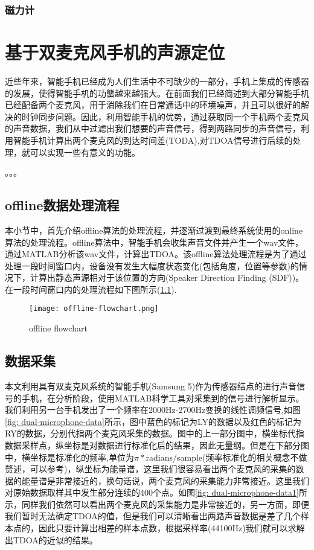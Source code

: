 \documentclass[winfonts]{njuthesis}
\begin{document}
		\subsection{磁力计}

\chapter{基于双麦克风手机的声源定位}\label{chapter_work}
	近些年来，智能手机已经成为人们生活中不可缺少的一部分，手机上集成的传感器的发展，使得智能手机的功螚越来越强大。在前面我们已经简述到大部分智能手机已经配备两个麦克风，用于消除我们在日常通话中的环境噪声，并且可以很好的解决的时钟同步问题。因此，利用智能手机的优势，通过获取同一个手机两个麦克风的声音数据，我们从中过滤出我们想要的声音信号，得到两路同步的声音信号，利用智能手机计算出两个麦克风的到达时间差(TODA),对TDOA信号进行后续的处理，就可以实现一些有意义的功能。
	
	。。。
	
	\section{offline数据处理流程}
	
		本小节中，首先介绍offline算法的处理流程，并逐渐过渡到最终系统使用的online算法的处理流程。offline算法中，智能手机会收集声音文件并产生一个wav文件，通过MATLAB分析该wav文件，计算出TDOA。该offline算法处理流程是为了通过处理一段时间窗口内，设备没有发生大幅度状态变化(包括角度，位置等参数)的情况下，计算出静态声源相对于该位置的方向(Speaker Direction Finding (SDF))。在一段时间窗口内的处理流程如下图所示(\ref{fig: offline-flowchart}).
		
		\begin{figure}[H]
			\centering
			\caption{offline flowchart}
			\texttt{[image: offline-flowchart.png]} 
			\label{fig: offline-flowchart}
		\end{figure}
	
	\section{数据采集}
		本文利用具有双麦克风系统的智能手机(Samsung 5)作为传感器结点的进行声音信号的手机，在分析阶段，使用MATLAB科学工具对采集到的信号进行解析显示。我们利用另一台手机发出了一个频率在2000Hz-2700Hz变换的线性调频信号,如图\ref{fig: dual-microphone-data}所示，图中蓝色的标记为LY的数据以及红色的标记为RY的数据，分别代指两个麦克风采集的数据。图中的上一部分图中，横坐标代指数据采样点，纵坐标是对数据进行标准化后的结果，因此无量纲。但是在下部分图中，横坐标是标准化的频率,单位为$\pi * $radians/sample(频率标准化的相关概念不做赘述，可以参考\cite{Normalized_frequency})，纵坐标为能量谱，这里我们很容易看出两个麦克风的采集的数据的能量谱是非常接近的，换句话说，两个麦克风的采集能力非常接近。这里我们对原始数据取样其中发生部分连续的400个点。如图\ref{fig: dual-microphone-data1}所示，同样我们依然可以看出两个麦克风的采集能力是非常接近的，另一方面，即便我们暂时无法确定TDOA的值，但是我们可以清晰看出两路声音数据是差了几个样本点的，因此只要计算出相差的样本点数，根据采样率(44100Hz)我们就可以求解出TDOA的近似的结果。
		
\end{document}
